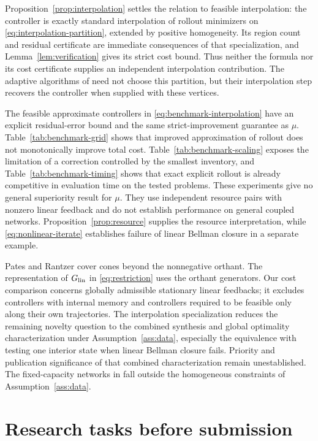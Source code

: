 \documentclass[10pt]{article}
\begin{document}
Proposition~\ref{prop:interpolation} settles the relation to feasible interpolation: the controller is exactly standard interpolation of rollout minimizers on \eqref{eq:interpolation-partition}, extended by positive homogeneity. Its region count and residual certificate are immediate consequences of that specialization, and Lemma~\ref{lem:verification} gives its strict cost bound. Thus neither the formula nor its cost certificate supplies an independent interpolation contribution. The adaptive algorithms of \cite{filippi-2004,bemporad-filippi-2006} need not choose this partition, but their interpolation step recovers the controller when supplied with these vertices.

The feasible approximate controllers in \eqref{eq:benchmark-interpolation} have an explicit residual-error bound and the same strict-improvement guarantee as $\mu$. Table~\ref{tab:benchmark-grid} shows that improved approximation of rollout does not monotonically improve total cost. Table~\ref{tab:benchmark-scaling} exposes the limitation of a correction controlled by the smallest inventory, and Table~\ref{tab:benchmark-timing} shows that exact explicit rollout is already competitive in evaluation time on the tested problems. These experiments give no general superiority result for $\mu$. They use independent resource pairs with nonzero linear feedback and do not establish performance on general coupled networks. Proposition~\ref{prop:resource} supplies the resource interpretation, while \eqref{eq:nonlinear-iterate} establishes failure of linear Bellman closure in a separate example.

Pates and Rantzer \cite{pates-rantzer} cover cones beyond the nonnegative orthant. The representation of $G_{\rm lin}$ in \eqref{eq:restriction} uses the orthant generators. Our cost comparison concerns globally admissible stationary linear feedbacks; it excludes controllers with internal memory and controllers required to be feasible only along their own trajectories. The interpolation specialization reduces the remaining novelty question to the combined synthesis and global optimality characterization under Assumption~\ref{ass:data}, especially the equivalence with testing one interior state when linear Bellman closure fails. Priority and publication significance of that combined characterization remain unestablished. The fixed-capacity networks in \cite{schurig-2026} fall outside the homogeneous constraints of Assumption~\ref{ass:data}.

\section*{Research tasks before submission}
\end{document}
